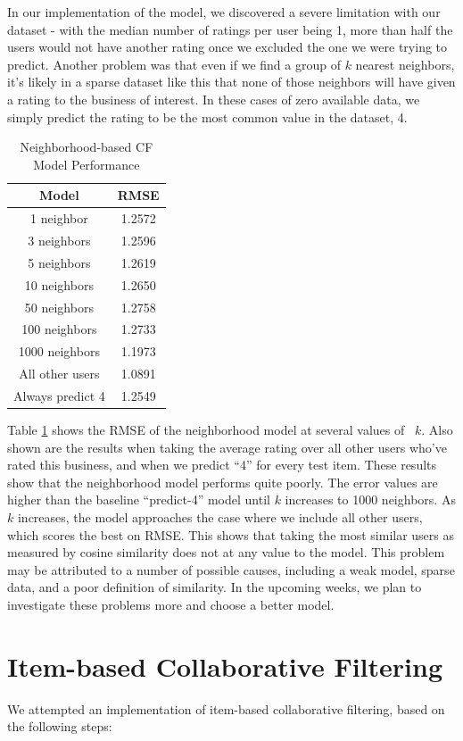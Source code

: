\documentclass[10pt, letterpaper]{article}
\begin{document}
In our implementation of the model, we discovered a severe
limitation with our dataset - with the median number of ratings per user
being 1, more than half the users would not have another rating once we
excluded the one we were trying to predict. Another problem was that even if we 
find a group of $k$ nearest neighbors, it's 
likely in a sparse dataset like this that none of those neighbors will have 
given a rating to the business of interest. In these cases of zero available data, we simply predict the rating to be the 
most common value in the dataset, 4. 

\begin{table}[htb]
\centering
\begin{tabular}{|c|c|}
\hline
{\bf Model} &{\bf RMSE} \tabularnewline \hline
1 neighbor &1.2572 \tabularnewline
3 neighbors &1.2596 \tabularnewline
5 neighbors &1.2619 \tabularnewline
10 neighbors &1.2650 \tabularnewline
50 neighbors &1.2758 \tabularnewline
100 neighbors &1.2733 \tabularnewline
1000 neighbors &1.1973 \tabularnewline
\hline
All other users &1.0891 \tabularnewline
Always predict 4 &1.2549
\tabularnewline \hline

\end{tabular}
\caption{ Neighborhood-based CF Model Performance }
\label{ncf}
\end{table}

Table \ref{ncf} shows the RMSE of the neighborhood model at several values 
of ~$k$. Also shown are the results when taking the average rating over all 
other users who've rated this business, and when we predict ``4'' for every 
test item. These results show that the neighborhood model performs quite 
poorly. The error values are higher than the baseline ``predict-4'' model 
until $k$ increases to 1000 neighbors. As $k$ increases, the model approaches 
the case where we include all other users, which scores the best on RMSE. This 
shows that taking the most similar users as measured by cosine similarity does 
not at any value to the model. This problem may be attributed to a number of 
possible causes, including a weak model, sparse data, and a poor definition of 
similarity. In the upcoming weeks, we plan to investigate these problems more 
and choose a better model.




\section{Item-based Collaborative Filtering}
We attempted an implementation of item-based collaborative
filtering, based on the following steps:
\end{document}
